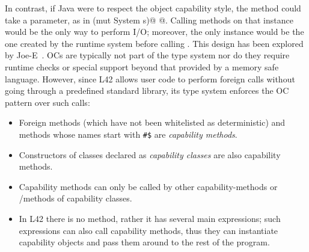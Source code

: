 In contrast, if Java were to respect the object capability style, the \Q@main@ method could take a \Q@System@ parameter, as in
 \Q@main(mut System s)@
 \lstset{language=Java}
@. \lstset{language=FortyTwo}%
Calling methods on that \Q@System@ instance would be the only way to perform I/O;
moreover, the only \Q@System@ instance would be the one created by the runtime system before calling \Q@main@. %
This design has been explored by Joe-E~\cite{finifter2008verifiable}.
OCs are typically not part of the type system nor do they require runtime checks or special support beyond that provided by a memory safe language. However, since
L42 allows user code to perform foreign calls without going through a predefined standard library, its type system enforces the OC pattern over such calls:
\begin{itemize}
\item Foreign methods (which have not been whitelisted as deterministic) and methods whose names start with \texttt{\#\$} are \emph{capability methods}.%
\item Constructors of classes declared as \emph{capability classes} are also capability methods.
\item Capability methods can only be called by other capability-methods or \Q@mut@/\Q@capsule@ methods of capability classes.
\item In L42 there is no \Q@main@ method, rather it has several main expressions; such expressions can also call capability methods, thus they can instantiate capability objects and pass them around to the rest of the program.

\end{itemize}


